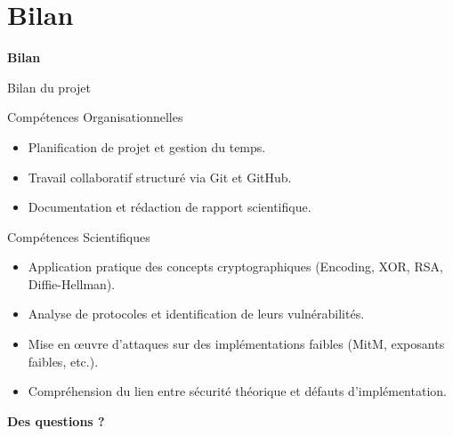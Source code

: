 
\section{Bilan}

\begin{frame}
    \centering
    \Huge{\bfseries Bilan}
\end{frame}

    \begin{frame}{Bilan du projet}
        
        \begin{block}{Compétences Organisationnelles}
            \begin{itemize}
                \item Planification de projet et gestion du temps.
                \item Travail collaboratif structuré via Git et GitHub.
                \item Documentation et rédaction de rapport scientifique.
            \end{itemize}
        \end{block}

        \begin{alertblock}{Compétences Scientifiques}
            \begin{itemize}
                \item Application pratique des concepts cryptographiques (Encoding, XOR, RSA, Diffie-Hellman).
                \item Analyse de protocoles et identification de leurs vulnérabilités.
                \item Mise en œuvre d'attaques sur des implémentations faibles (MitM, exposants faibles, etc.).
                \item Compréhension du lien entre sécurité théorique et défauts d'implémentation.
            \end{itemize}
        \end{alertblock}

    \end{frame}
\begin{frame}
    \centering
    \Huge{\bfseries Des questions ?}
\end{frame}